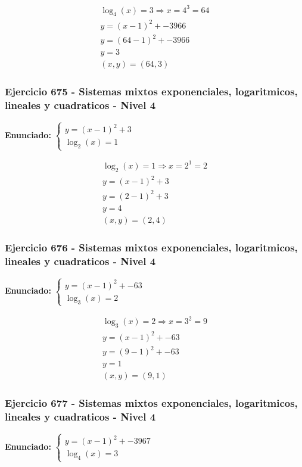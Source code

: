 \documentclass[12pt,a4paper]{article}
\begin{document}
\[
\begin{aligned}
\log_{4}\left(x\right)=3\Rightarrow x=4^{3}=64\\
y=(x-1)^2+-3966\\
y=(64-1)^2+-3966\\
y=3\\
\boxed{(x,y)=(64,3)}
\end{aligned}
\]


\subsubsection*{Ejercicio 675 - Sistemas mixtos exponenciales, logaritmicos, lineales y cuadraticos - Nivel 4}
\textbf{Enunciado:} \(\begin{cases} y=(x-1)^2+3\\ \log_{2}\left(x\right)=1\end{cases}\)

\[
\begin{aligned}
\log_{2}\left(x\right)=1\Rightarrow x=2^{1}=2\\
y=(x-1)^2+3\\
y=(2-1)^2+3\\
y=4\\
\boxed{(x,y)=(2,4)}
\end{aligned}
\]


\subsubsection*{Ejercicio 676 - Sistemas mixtos exponenciales, logaritmicos, lineales y cuadraticos - Nivel 4}
\textbf{Enunciado:} \(\begin{cases} y=(x-1)^2+-63\\ \log_{3}\left(x\right)=2\end{cases}\)

\[
\begin{aligned}
\log_{3}\left(x\right)=2\Rightarrow x=3^{2}=9\\
y=(x-1)^2+-63\\
y=(9-1)^2+-63\\
y=1\\
\boxed{(x,y)=(9,1)}
\end{aligned}
\]


\subsubsection*{Ejercicio 677 - Sistemas mixtos exponenciales, logaritmicos, lineales y cuadraticos - Nivel 4}
\textbf{Enunciado:} \(\begin{cases} y=(x-1)^2+-3967\\ \log_{4}\left(x\right)=3\end{cases}\)
\end{document}
